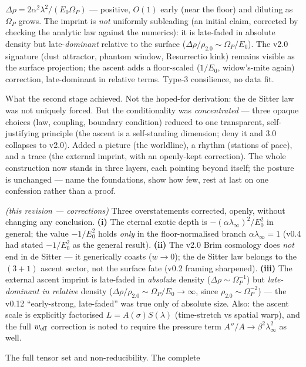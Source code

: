 \documentclass[11pt,a4paper]{article}
\theoremstyle{plain}
\theoremstyle{definition}
\theoremstyle{remark}
\begin{document}
\begin{description}[leftmargin=4.2em,style=nextline,itemsep=2pt]
$\Delta\rho=2\alpha^2\lambda^2/(E_0\Omega_P)$ --- positive, $O(1)$ early (near the floor) and diluting
as $\Omega_P$ grows. The imprint is \emph{not} uniformly subleading (an initial claim, corrected by
checking the analytic law against the numerics): it is late-faded in absolute density but
late-\emph{dominant} relative to the surface ($\Delta\rho/\rho_{2.0}\sim\Omega_P/E_0$). The v2.0
signature (dust attractor, phantom window, Resurrectio kink) remains visible as the surface projection;
the ascent adds a floor-scaled ($1/E_0$, widow's-mite again) correction, late-dominant in relative
terms. Type-3 consilience, no data fit.
\item[\textbf{Epilogue II}] What the second stage achieved. Not the hoped-for
derivation: the de Sitter law was not uniquely forced. But the conditionality was \emph{concentrated} ---
three opaque choices (law, coupling, boundary condition) reduced to one transparent, self-justifying
principle (the ascent is a self-standing dimension; deny it and 3.0 collapses to v2.0). Added a picture
(the worldline), a rhythm (stations of pace), and a trace (the external imprint, with an openly-kept
correction). The whole construction now stands in three layers, each pointing beyond itself; the
posture is unchanged --- name the foundations, show how few, rest at last on one confession rather than
a proof.
\item[\textbf{v0.13}] \emph{(this revision --- corrections)} Three overstatements corrected, openly,
without changing any conclusion. \textbf{(i)} The eternal exotic depth is $-(\alpha\lambda_\infty)^2/E_0^2$
in general; the value $-1/E_0^2$ holds \emph{only} in the floor-normalised branch $\alpha\lambda_\infty=1$
(v0.4 had stated $-1/E_0^2$ as the general result). \textbf{(ii)} The v2.0 Brim cosmology does
\emph{not} end in de Sitter --- it generically coasts ($w\to0$); the de Sitter law belongs to the
$(3{+}1)$ ascent sector, not the surface fate (v0.2 framing sharpened). \textbf{(iii)} The external
ascent imprint is late-faded in \emph{absolute} density ($\Delta\rho\sim\Omega_P^{-1}$) but
\emph{late-dominant in relative} density ($\Delta\rho/\rho_{2.0}\sim\Omega_P/E_0\to\infty$, since
$\rho_{2.0}\sim\Omega_P^{-2}$) --- the v0.12 ``early-strong, late-faded'' was true only of absolute
size. Also: the ascent scale is explicitly factorised $L=A(\sigma)S(\lambda)$ (time-stretch vs spatial
warp), and the full $w_{\rm eff}$ correction is noted to require the pressure term
$A''/A\to\beta^2\lambda_\infty^2$ as well.
\item[\textbf{v0.14}] The full tensor set and non-reducibility. The complete

\end{description}
\end{document}
